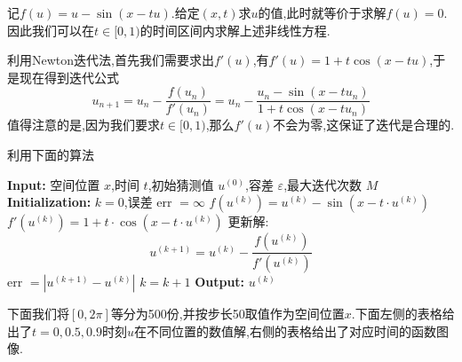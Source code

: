 记$f(u)=u-\sin(x-tu)$.给定$(x,t)$求$u$的值,此时就等价于求解$f(u)=0$.因此我们可以在$t\in [0,1)$的时间区间内求解上述非线性方程.\par
利用Newton迭代法,首先我们需要求出$f'(u)$,有$f'(u)=1+t\cos(x-tu)$,于是现在得到迭代公式
$$
u_{n+1}=u_n-\frac{f(u_n)}{f'(u_n)}=u_n-\frac{u_n-\sin(x-tu_n)}{1+t\cos(x-tu_n)}
$$
值得注意的是,因为我们要求$t\in[0,1)$,那么$f'(u)$不会为零,这保证了迭代是合理的.\par
利用下面的算法
\begin{algorithm}[H]
\caption{牛顿法求解隐式解 $u = \sin(x - tu)$}
\begin{algorithmic}[1]
\State \textbf{Input:} 空间位置 $x$,时间 $t$,初始猜测值 $u^{(0)}$,容差 $\varepsilon$,最大迭代次数 $M$
\State \textbf{Initialization:} $k = 0$,误差 err $= \infty$
    \State $f(u^{(k)}) = u^{(k)} - \sin(x - t \cdot u^{(k)})$
    \State $f'(u^{(k)}) = 1 + t \cdot \cos(x - t \cdot u^{(k)})$
    \State 更新解:
    $$u^{(k+1)} = u^{(k)} - \frac{f(u^{(k)})}{f'(u^{(k)})}$$
    \State err $= |u^{(k+1)} - u^{(k)}|$
    \State $k = k + 1$
\EndWhile
\State \textbf{Output:} $u^{(k)}$
\end{algorithmic}
\end{algorithm}
下面我们将$[0,2\pi]$等分为500份,并按步长50取值作为空间位置$x$.下面左侧的表格给出了$t=0,0.5,0.9$时刻$u$在不同位置的数值解,右侧的表格给出了对应时间的函数图像.\par
